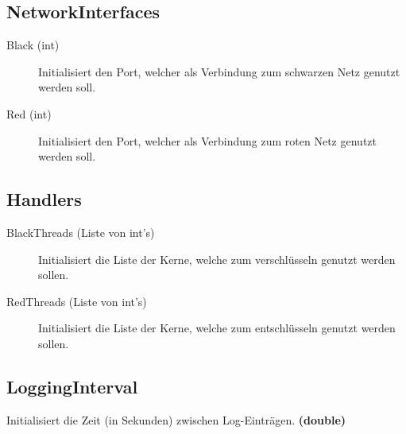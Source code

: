 \documentclass[a4paper, 11pt, ngerman, fleqn]{article}
\begin{document}
\subsection{NetworkInterfaces}
\begin{description}
	\item [Black (int)] Initialisiert den Port, welcher als Verbindung zum schwarzen Netz genutzt werden soll.
	\item [Red (int)] Initialisiert den Port, welcher als Verbindung zum roten Netz genutzt werden soll.
\end{description}

\subsection{Handlers}
\begin{description}
	\item [BlackThreads (Liste von int's)] Initialisiert die Liste der Kerne, welche zum verschlüsseln genutzt werden sollen.
	\item [RedThreads (Liste von int's)] Initialisiert die Liste der Kerne, welche zum entschlüsseln genutzt werden sollen.
\end{description}

\subsection{LoggingInterval}
Initialisiert die Zeit (in Sekunden) zwischen Log-Einträgen. \textbf{(double)}
\end{document}

